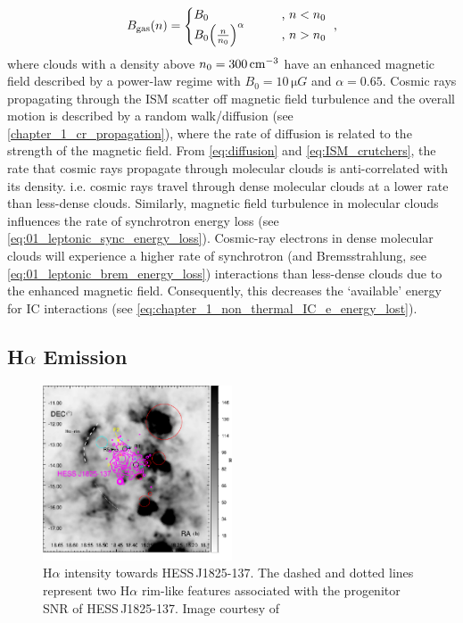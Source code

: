 \begin{equation}
    \begin{aligned}
        B_\text{gas}\qty(n)=
    \begin{cases}
        B_0 \qquad &\text{, } n < n_0 \\
        B_0\qty(\frac{n}{n_0})^\alpha \qquad &\text{, } n > n_0
    \end{cases}\text{ ,}
    \end{aligned} \label{eq:ISM_crutchers}
\end{equation}
\noindent where clouds with a density above $n_0=300\,\si{\per\centi\meter\cubed}$ have an enhanced magnetic field described by a power-law regime with $B_0=10\,\si{\micro G}$ and $\alpha=0.65$.
\newpar 
Cosmic rays propagating through the ISM scatter off magnetic field turbulence and the overall motion is described by a random walk/diffusion (see \autoref{chapter_1_cr_propagation}), where the rate of diffusion is related to the strength of the magnetic field. From \autoref{eq:diffusion} and \autoref{eq:ISM_crutchers}, the rate that cosmic rays propagate through molecular clouds is anti-correlated with its density. i.e. cosmic rays travel through dense molecular clouds at a lower rate than less-dense clouds. Similarly, magnetic field turbulence in molecular clouds influences the rate of synchrotron energy loss (see \autoref{eq:01_leptonic_sync_energy_loss}). Cosmic-ray electrons in dense molecular clouds will experience a higher rate of synchrotron (and Bremsstrahlung, see \autoref{eq:01_leptonic_brem_energy_loss}) interactions than less-dense clouds due to the enhanced magnetic field. Consequently, this decreases the `available' energy for IC interactions (see \autoref{eq:chapter_1_non_thermal_IC_e_energy_lost}). 

\subsection{H$\alpha$ Emission}

\begin{figure}
	\centering
	\includegraphics[width=0.5\textwidth]{06_Interstellar_Medium/Images/Theory/Fabien_Halpha.pdf}
	\caption{H$\alpha$ intensity towards \mbox{HESS\,J1825-137}. The dashed and dotted lines represent two H$\alpha$ rim-like features associated with the progenitor SNR of \mbox{HESS\,J1825-137}. Image courtesy of \citep{2016MNRAS.458.2813V}}
	\label{fig:06_1825_SNR}
\end{figure}

